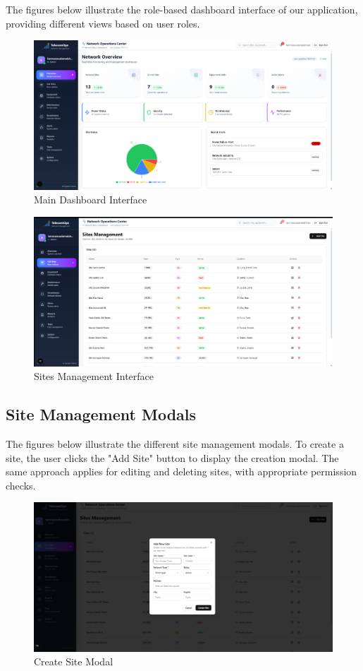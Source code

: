 The figures below illustrate the role-based dashboard interface of our application, providing different views based on user roles.

\begin{figure}[H]
    \centering
    \includegraphics[width=0.9\linewidth]{img/chap_03/dashboard_main.png}
    \caption{Main Dashboard Interface}
    \label{fig:dashboard_main}
\end{figure}

\begin{figure}[H]
    \centering
    \includegraphics[width=0.9\linewidth]{img/chap_03/sites_list.png}
    \caption{Sites Management Interface}
    \label{fig:sites_list}
\end{figure}

\subsection{Site Management Modals}

The figures below illustrate the different site management modals. To create a site, the user clicks the "Add Site" button to display the creation modal. The same approach applies for editing and deleting sites, with appropriate permission checks.

\begin{figure}[H]
    \centering
    \includegraphics[width=0.9\linewidth]{img/chap_03/create_site_modal.png}
    \caption{Create Site Modal}
    \label{fig:add_site_modal}
\end{figure}

